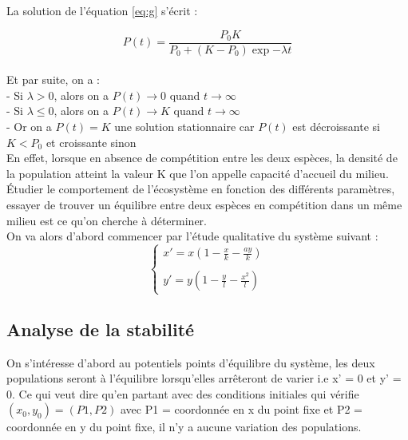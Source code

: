 \documentclass{article}
\begin{document}
La solution de l'équation \eqref{eq:g} s'écrit :

\begin{equation*}
    P(t) = \frac{P_{0}K}{P_{0}+(K-P_{0})\exp{-\lambda}t}
\end{equation*}\\

Et par suite, on a :\\

\noindent
- Si $\lambda > 0$, alors on a $P(t) \longrightarrow 0$ quand $t \longrightarrow \infty$\\

\noindent
- Si $\lambda \leqslant 0$, alors on a $P(t) \longrightarrow K$ quand $t \longrightarrow \infty$\\


\noindent
- Or on a $P(t) = K$ une solution stationnaire car $P(t)$ est décroissante si $K < P_0$ et croissante sinon\\

En effet, lorsque en absence de compétition entre les deux espèces, la densité de la population atteint la valeur K que l'on appelle capacité d'accueil du milieu.\\

Étudier le comportement de l'écosystème en fonction des différents paramètres, essayer de trouver un équilibre entre deux espèces en compétition dans un même milieu est ce qu'on cherche à déterminer.\\

On va alors d'abord commencer par l'étude qualitative du système suivant :\\
\vspace{1cm}
\begin{equation}
\tag{S}
\left\{
\begin{array}{cc}
   x' =  x(1 - \frac{x}{k} - \frac{a y}{k}) \\\\
   y' = y(1- \frac{y}{l} - \frac{x^{2}}{l})
\end{array}
\right.
\end{equation}

\newpage

\subsection{Analyse de la stabilité}
On s'intéresse d'abord au potentiels points d'équilibre du système, les deux populations seront à l'équilibre lorsqu'elles arrêteront de varier i.e x' = 0 et y' = 0. Ce qui veut dire qu'en partant avec des conditions initiales qui vérifie $(x_{0},y_{0}) = (P1, P2)$
avec P1 = coordonnée en x du point fixe et P2 = coordonnée en y du point fixe, il n'y a aucune variation des populations.
\end{document}
